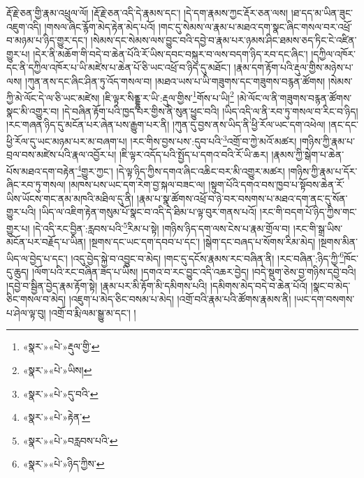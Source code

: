 རྡོ་རྗེ་ཅན་གྱི་རྣམ་འཕྲུལ་ལོ། །རྡོ་རྗེ་ཅན་འདི་དེ་རྣམས་དང་། །དེ་དག་རྣམས་ཀྱང་རྡོར་ཅན་ལས། །ཐ་དད་མ་ཡིན་ཟུང་འཇུག་འདི། །གསལ་ཞིང་རྙོག་མེད་རྟེན་མེད་པའོ། །གང་དུ་སེམས་ལ་རྣམ་པ་མཐའ་དག་སྣང་ཞིང་གསལ་བར་འཕྲོ་བ་མཉམ་པ་ཉིད་གྱུར་དང་། །སེམས་དང་སེམས་ལས་བྱུང་བའི་དབྱེ་བ་རྣམ་པར་ཉམས་ཤིང་ཐམས་ཅད་ཏིང་ངེ་འཛིན་གྱུར་པ། །དེར་ནི་མཆོག་གི་བདེ་བ་ཆེན་པོའི་རོ་ཡིས་དབང་བསྐུར་བ་ལས་བདག་ཉིད་རབ་དང་ཞིང་། །དཀྱིལ་འཁོར་དང་ནི་དཀྱིལ་འཁོར་པ་ཡི་མཛེས་པ་ཆེན་པོ་ཅི་ཡང་འཕྲོ་བ་ཉིད་དུ་མཐོང་། །རྣམ་དག་རྟོག་པའི་རྡུལ་གྱིས་མཉེས་པ་ལས། །ཀུན་ནས་དང་ཞིང་ཤིན་ཏུ་འོད་གསལ་བ། །མཐའ་ཡས་པ་ཡི་གཟུགས་དང་གཟུགས་བརྙན་ཚོགས། །སེམས་ཀྱི་མེ་ལོང་དེ་ལ་ཅི་ཡང་མཛེས། །ཇི་ལྟར་སིནྡྷུ་ར་ཡི་:རྡུལ་གྱིས་\footnote{«སྣར་»«པེ་»རྡུལ་གྱི་}གོས་པ་ཡི།\footnote{«སྣར་»«པེ་»ཡིས།} །མེ་ལོང་ལ་ནི་གཟུགས་བརྙན་ཚོགས་སྣང་མི་འགྱུར་བ། །དེ་བཞིན་རྟོག་པའི་ཁྱད་པར་གྱིས་ནི་སུན་ཕྱུང་བའི། །ཡིད་འདི་ལ་ནི་རབ་ཏུ་གསལ་བ་རིང་བ་ཉིད། །རང་གཞན་ཉིད་དུ་མངོན་པར་ཞེན་པས་རྒྱུག་པར་ནི། །ཀུན་དུ་བྱས་ནས་ཡིད་ནི་ཕྱི་རོལ་ཡང་དག་འཕེལ། །ནང་དང་ཕྱི་རོལ་དུ་ཡང་མཉམ་པར་མ་བཞག་པ། །རང་གིས་བྱས་པས་:དུབ་པའི་\footnote{«སྣར་»«པེ་»དུ་བའི་}འགྲོ་བ་ཀྱེ་མའོ་མཚར། །གཉིས་ཀྱི་རྣམ་པ་བྲལ་བས་མཛེས་པའི་རྣལ་འབྱོར་པ། །ཇི་ལྟར་འདོད་པའི་སྤྱོད་པ་དགའ་བའི་རོ་ཡི་ཆར། །རྣམས་ཀྱི་སྒེག་པ་ཆེན་པོས་མཐའ་དག་བརྟེན་\footnote{«སྣར་»«པེ་»རྟེན་}གྱུར་ཀྱང་། །དེ་ལྟ་ཉིད་ཀྱིས་དགའ་ཞིང་འཆིང་བར་མི་འགྱུར་མཚར། །གཉིས་ཀྱི་རྣམ་པ་དོར་ཞིང་རབ་ཏུ་གསལ། །མཁས་པས་ཡང་དག་རེག་བྱ་སྐལ་བཟང་ལ། །སྟུག་པོའི་དགའ་བས་ཁྱབ་པ་སྟོབས་ཆེན་རོ་ཡིས་ཡོངས་གང་ནམ་མཁའི་མཐིལ་དུ་ནི། །རྣམ་པ་སྣ་ཚོགས་འཕྲོ་བ་ཉེ་བར་བསགས་པ་མཐའ་དག་ནང་དུ་སོན་གྱུར་པའི། །ཡིད་ལ་འཇིག་རྟེན་གསུམ་པོ་སྣང་བ་འདི་དེ་ཐིམ་པ་ལྟ་བུར་གནས་པའོ། །རང་གི་བདག་པོ་ཉིད་ཀྱིས་གང་གྱུར་པ། །དེ་འདི་རང་བྱིན་:རླབས་པའི་\footnote{«སྣར་»«པེ་»བརླབས་པའི་}རིམ་པ་སྟེ། །གཉིས་ཉིད་དག་ལས་ངེས་པ་རྣམ་གྲོལ་བ། །རང་གི་སྒྲ་ཡིས་མངོན་པར་བརྗོད་པ་ཡིན། །སྔགས་དང་ཡང་དག་དབབ་པ་དང་། །སྒེག་དང་བཞད་པ་སོགས་རིམ་མེད། །སྔགས་མིན་ཡིད་ལ་བྱེད་པ་དང་། །འདུ་བྱེད་སྐྱེ་བ་འབྱུང་བ་མེད། །གང་དུ་དངོས་རྣམས་རང་བཞིན་ནི། །རང་བཞིན་:ཉིད་ཀྱི་\footnote{«སྣར་»«པེ་»ཉིད་ཀྱིས་}ཁོང་དུ་ཆུད། །ལོག་པའི་རང་བཞིན་ཟད་པ་ཡིས། །དགའ་བ་རང་བྱུང་འདི་འཆར་བྱེད། །བདེ་སྡུག་ཅེས་བྱ་གཉིས་དབྱེ་བའི། །དབྱེ་བ་སྦྱིན་བྱེད་རྣམ་རྟོག་སྟེ། །རྣམ་པར་མི་རྟོག་མི་དམིགས་པའི། །དམིགས་མེད་བདེ་བ་ཆེན་པོའོ། །སྣང་བ་མེད་ཅིང་གསལ་བ་མེད། །འཇུག་པ་མེད་ཅིང་བསམ་པ་མེད། །འགྲོ་བའི་རྣམ་པའི་ཚོགས་རྣམས་ནི། །ཡང་དག་བསགས་པ་ཤེལ་ལྟ་བུ། །འགྲོ་བ་རྨི་ལམ་སྒྱུ་མ་དང་། །
